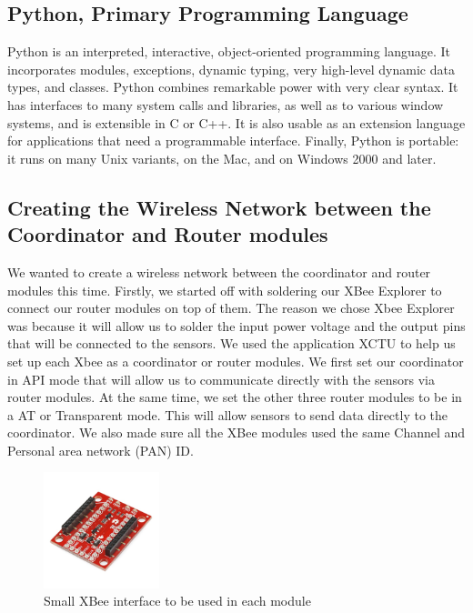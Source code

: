 \documentclass[a4paper,11pt]{report}
\begin{document}
	
	\subsection{Python, Primary Programming Language}
	Python is an interpreted, interactive, object-oriented programming language. It incorporates modules, exceptions, dynamic typing, very high-level dynamic data types, and classes. Python combines remarkable power with very clear syntax. It has interfaces to many system calls and libraries, as well as to various window systems, and is extensible in C or C++. It is also usable as an extension language for applications that need a programmable interface. Finally, Python is portable: it runs on many Unix variants, on the Mac, and on Windows 2000 and later.
	\subsection{Creating the Wireless Network between the Coordinator and Router modules}
	\par We wanted to create a wireless network between the coordinator and router modules this time. Firstly, we started off with soldering our XBee Explorer to connect our router modules on top of them. The reason we chose Xbee Explorer was because it will allow us to solder the input power voltage and the output pins that will be connected to the sensors. We used the application XCTU to help us set up each Xbee as a coordinator or router modules. We first set our coordinator in API mode that will allow us to communicate directly with the sensors via router modules. At the same time, we set the other three router modules to be in a AT or Transparent mode. This will allow sensors to send data directly to the coordinator. We also made sure all the XBee modules used the same Channel and Personal area network (PAN) ID. 
	\begin{figure}[h]
		\centering
		\includegraphics[width = 0.3\textwidth]{xbeeMiniExplorer.png}
		\caption{Small XBee interface to be used in each module}
	\end{figure}
\end{document}

